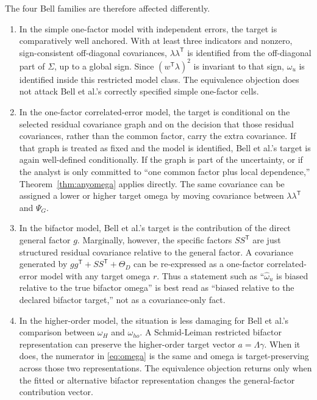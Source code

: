 \documentclass[11pt]{article}
\newcommand{\T}{^{\mathsf T}}
\theoremstyle{plain}
\theoremstyle{remark}
\begin{document}
The four Bell families are therefore affected differently.

\begin{enumerate}
  \item In the simple one-factor model with independent errors, the target is
  comparatively well anchored. With at least three indicators and nonzero,
  sign-consistent off-diagonal covariances, \(\lambda\lambda\T\) is identified
  from the off-diagonal part of \(\Sigma\), up to a global sign. Since
  \((w\T\lambda)^2\) is invariant to that sign, \(\omega_u\) is identified
  inside this restricted model class. The equivalence objection does not attack
  Bell et al.'s correctly specified simple one-factor cells.

  \item In the one-factor correlated-error model, the target is conditional on
  the selected residual covariance graph and on the decision that those
  residual covariances, rather than the common factor, carry the extra
  covariance. If that graph is treated as fixed and the model is identified,
  Bell et al.'s target is again well-defined conditionally. If the graph is part
  of the uncertainty, or if the analyst is only committed to ``one common factor
  plus local dependence,'' Theorem~\ref{thm:anyomega} applies directly. The same
  covariance can be assigned a lower or higher target omega by moving covariance
  between \(\lambda\lambda\T\) and \(\Psi_G\).

  \item In the bifactor model, Bell et al.'s target is the contribution of the
  direct general factor \(g\). Marginally, however, the specific factors
  \(SS\T\) are just structured residual covariance relative to the general
  factor. A covariance generated by \(g g\T+SS\T+\Theta_D\) can be re-expressed
  as a one-factor correlated-error model with any target omega \(r\). Thus a
  statement such as ``\(\hat\omega_u\) is biased relative to the true bifactor
  omega'' is best read as ``biased relative to the declared bifactor target,''
  not as a covariance-only fact.

  \item In the higher-order model, the situation is less damaging for Bell et
  al.'s comparison between \(\omega_H\) and \(\omega_{ho}\). A Schmid-Leiman
  restricted bifactor representation can preserve the higher-order target vector
  \(a=\Lambda\gamma\). When it does, the numerator in \eqref{eq:omega} is the
  same and omega is target-preserving across those two representations. The
  equivalence objection returns only when the fitted or alternative bifactor
  representation changes the general-factor contribution vector.
\end{enumerate}
\end{document}

